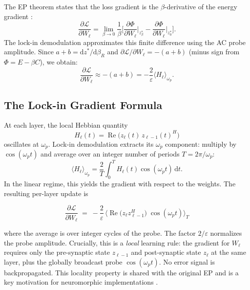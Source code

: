 \documentclass[11pt]{article}
\newcommand{\dd}{\mathrm{d}}
\DeclareMathOperator{\Real}{Re}
\begin{document}
The EP theorem states that the loss gradient is the $\beta$-derivative of the energy gradient \citep{scellier2017equilibrium,scellier2018equivalence}:
\begin{equation}
\frac{\partial \mathcal{L}}{\partial W_\ell} = \lim_{\beta\to 0} \frac{1}{\beta}\Big[
\frac{\partial \Phi}{\partial W_\ell}\big|_{z_\beta^*} - \frac{\partial \Phi}{\partial W_\ell}\big|_{z_0^*}
\Big].
\end{equation}
The lock-in demodulation approximates this finite difference using the AC probe amplitude. Since $a+b = \dd z^*/\dd\beta_R$ and $\partial\mathcal{L}/\partial W_\ell = -(a+b)$ (minus sign from $\Phi = E - \beta C$), we obtain:
\begin{equation}
\frac{\partial \mathcal{L}}{\partial W_\ell} \approx - (a+b) = -\frac{2}{\varepsilon} \langle H_\ell \rangle_{\omega_p}.
\end{equation}

\subsection{The Lock-in Gradient Formula}

At each layer, the local Hebbian quantity
\begin{equation}
H_\ell(t) = \Real\big( z_\ell(t) \, z_{\ell-1}(t)^H \big)
\end{equation}
oscillates at $\omega_p$. Lock-in demodulation extracts its $\omega_p$ component: multiply by $\cos(\omega_p t)$ and average over an integer number of periods $T = 2\pi/\omega_p$:
\begin{equation}
\langle H_\ell \rangle_{\omega_p} = \frac{2}{T}\int_0^T H_\ell(t) \cos(\omega_p t) \, \dd t.
\end{equation}
In the linear regime, this yields the gradient with respect to the weights. The resulting per-layer update is

\begin{equation}\boxed{
\frac{\partial \mathcal{L}}{\partial W_\ell}
\;=\;
-\frac{2}{\varepsilon}\,
\Big\langle \Real\big(z_\ell z_{\ell-1}^H\big)\;\cos(\omega_p t) \Big\rangle_T
}\label{eq:lockin-gradient}
\end{equation}

where the average is over integer cycles of the probe. The factor $2/\varepsilon$ normalizes the probe amplitude. Crucially, this is a \emph{local} learning rule: the gradient for $W_\ell$ requires only the pre-synaptic state $z_{\ell-1}$ and post-synaptic state $z_\ell$ at the same layer, plus the globally broadcast probe $\cos(\omega_p t)$. No error signal is backpropagated. This locality property is shared with the original EP \citep{scellier2017equilibrium} and is a key motivation for neuromorphic implementations \citep{ororbia2023brain,whittington2019theories}.
\end{document}
